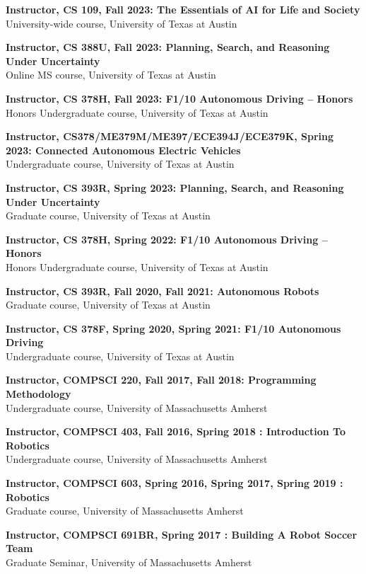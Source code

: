 \documentclass[Times]{article}
\begin{document}
\setlength{\parskip}{1em}
{\bf Instructor, CS 109, Fall 2023: The Essentials of AI for Life and Society}\\
University-wide course, University of Texas at Austin

{\bf Instructor, CS 388U, Fall 2023: Planning, Search, and Reasoning Under Uncertainty}\\
Online MS course, University of Texas at Austin

{\bf Instructor, CS 378H, Fall 2023: F1/10 Autonomous Driving -- Honors}\\
Honors Undergraduate course, University of Texas at Austin

{\bf Instructor, CS378/ME379M/ME397/ECE394J/ECE379K, Spring 2023: Connected  Autonomous Electric  Vehicles}\\
Undergraduate course, University of Texas at Austin

{\bf Instructor, CS 393R, Spring 2023: Planning, Search, and Reasoning Under Uncertainty}\\
Graduate course, University of Texas at Austin

{\bf Instructor, CS 378H, Spring 2022: F1/10 Autonomous Driving -- Honors}\\
Honors Undergraduate course, University of Texas at Austin

{\bf Instructor, CS 393R, Fall 2020, Fall 2021: Autonomous Robots}\\
Graduate course, University of Texas at Austin

{\bf Instructor, CS 378F, Spring 2020, Spring 2021: F1/10 Autonomous Driving}\\
Undergraduate course, University of Texas at Austin

{\bf Instructor, COMPSCI 220, Fall 2017, Fall 2018: Programming Methodology}\\
Undergraduate course, University of Massachusetts Amherst

{\bf Instructor, COMPSCI 403, Fall 2016, Spring 2018 : Introduction To
Robotics}\\
Undergraduate course, University of Massachusetts Amherst

{\bf Instructor, COMPSCI 603, Spring 2016, Spring 2017, Spring 2019 : Robotics}\\
\hfill Graduate course, University of Massachusetts Amherst

{\bf Instructor, COMPSCI 691BR, Spring 2017 : Building A Robot Soccer Team}\\
Graduate Seminar, University of Massachusetts Amherst
\end{document}
